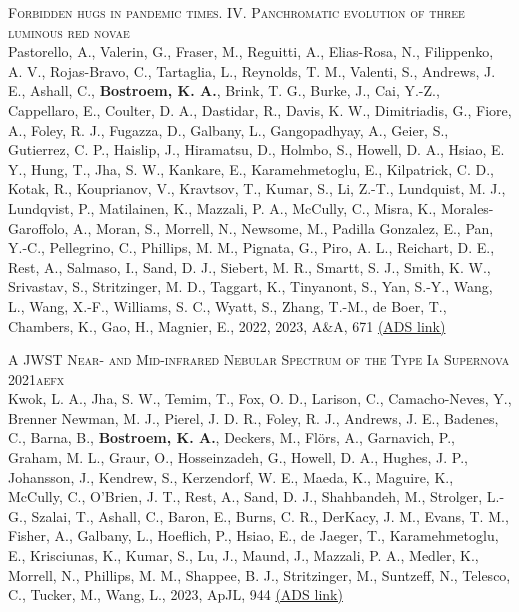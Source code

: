 \begin{revnumerate}[67]
    \item{\textsc{Forbidden hugs in pandemic times. IV. Panchromatic evolution of three luminous red novae}\\ 
    Pastorello, A., Valerin, G., Fraser, M., Reguitti, A., Elias-Rosa, N., Filippenko, A. V., Rojas-Bravo, C., Tartaglia, L., Reynolds, T. M., Valenti, S., Andrews, J. E., Ashall, C., \textbf{Bostroem, K. A.}, Brink, T. G., Burke, J., Cai, Y.-Z., Cappellaro, E., Coulter, D. A., Dastidar, R., Davis, K. W., Dimitriadis, G., Fiore, A., Foley, R. J., Fugazza, D., Galbany, L., Gangopadhyay, A., Geier, S., Gutierrez, C. P., Haislip, J., Hiramatsu, D., Holmbo, S., Howell, D. A., Hsiao, E. Y., Hung, T., Jha, S. W., Kankare, E., Karamehmetoglu, E., Kilpatrick, C. D., Kotak, R., Kouprianov, V., Kravtsov, T., Kumar, S., Li, Z.-T., Lundquist, M. J., Lundqvist, P., Matilainen, K., Mazzali, P. A., McCully, C., Misra, K., Morales-Garoffolo, A., Moran, S., Morrell, N., Newsome, M., Padilla Gonzalez, E., Pan, Y.-C., Pellegrino, C., Phillips, M. M., Pignata, G., Piro, A. L., Reichart, D. E., Rest, A., Salmaso, I., Sand, D. J., Siebert, M. R., Smartt, S. J., Smith, K. W., Srivastav, S., Stritzinger, M. D., Taggart, K., Tinyanont, S., Yan, S.-Y., Wang, L., Wang, X.-F., Williams, S. C., Wyatt, S., Zhang, T.-M., de Boer, T., Chambers, K., Gao, H., Magnier, E., 2022, 2023, A\&A, 671 
    \color{blue}\href{https://ui.adsabs.harvard.edu/abs/2023A&A...671A.158P}{(ADS link)}\color{black}}\\

    \item{\textsc{A JWST Near- and Mid-infrared Nebular Spectrum of the Type Ia Supernova 2021aefx}\\ 
    Kwok, L. A., Jha, S. W., Temim, T., Fox, O. D., Larison, C., Camacho-Neves, Y., Brenner Newman, M. J., Pierel, J. D. R., Foley, R. J., Andrews, J. E., Badenes, C., Barna, B., \textbf{Bostroem, K. A.}, Deckers, M., Flörs, A., Garnavich, P., Graham, M. L., Graur, O., Hosseinzadeh, G., Howell, D. A., Hughes, J. P., Johansson, J., Kendrew, S., Kerzendorf, W. E., Maeda, K., Maguire, K., McCully, C., O'Brien, J. T., Rest, A., Sand, D. J., Shahbandeh, M., Strolger, L.-G., Szalai, T., Ashall, C., Baron, E., Burns, C. R., DerKacy, J. M., Evans, T. M., Fisher, A., Galbany, L., Hoeflich, P., Hsiao, E., de Jaeger, T., Karamehmetoglu, E., Krisciunas, K., Kumar, S., Lu, J., Maund, J., Mazzali, P. A., Medler, K., Morrell, N., Phillips, M. M., Shappee, B. J., Stritzinger, M., Suntzeff, N., Telesco, C., Tucker, M., Wang, L., 2023, ApJL, 944 
    \color{blue}\href{https://ui.adsabs.harvard.edu/abs/2023ApJ...944L...3K}{(ADS link)}\color{black}}\\
    

\end{revnumerate}
